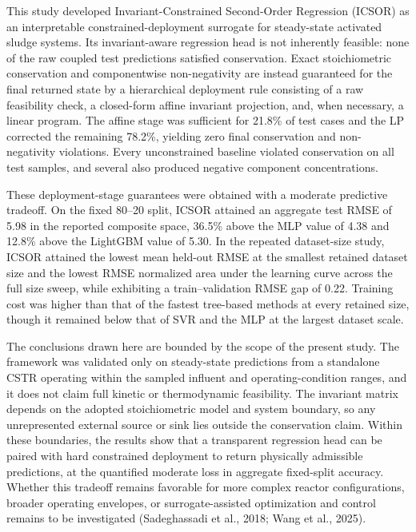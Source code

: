 \documentclass[a4paper,fleqn]{cas-sc}
\newenvironment{currentrevblock}{\begingroup\color{currentRevisionBlue}}{\endgroup}
\newenvironment{currentrevblock}{}{}
\newenvironment{revblock}{}{}
\begin{document}
\begin{revblock}

\begin{currentrevblock}
This study developed Invariant-Constrained Second-Order Regression (ICSOR) as an interpretable constrained-deployment surrogate for steady-state activated sludge systems. Its invariant-aware regression head is not inherently feasible: none of the raw coupled test predictions satisfied conservation. Exact stoichiometric conservation and componentwise non-negativity are instead guaranteed for the final returned state by a hierarchical deployment rule consisting of a raw feasibility check, a closed-form affine invariant projection, and, when necessary, a linear program. The affine stage was sufficient for 21.8\% of test cases and the LP corrected the remaining 78.2\%, yielding zero final conservation and non-negativity violations. Every unconstrained baseline violated conservation on all test samples, and several also produced negative component concentrations.
\end{currentrevblock}

\begin{currentrevblock}
These deployment-stage guarantees were obtained with a moderate predictive tradeoff. On the fixed 80--20 split, ICSOR attained an aggregate test RMSE of 5.98 in the reported composite space, 36.5\% above the MLP value of 4.38 and 12.8\% above the LightGBM value of 5.30. In the repeated dataset-size study, ICSOR attained the lowest mean held-out RMSE at the smallest retained dataset size and the lowest RMSE normalized area under the learning curve across the full size sweep, while exhibiting a train--validation RMSE gap of 0.22. Training cost was higher than that of the fastest tree-based methods at every retained size, though it remained below that of SVR and the MLP at the largest dataset scale.
\end{currentrevblock}

\begin{currentrevblock}
The conclusions drawn here are bounded by the scope of the present study. The framework was validated only on steady-state predictions from a standalone CSTR operating within the sampled influent and operating-condition ranges, and it does not claim full kinetic or thermodynamic feasibility. The invariant matrix depends on the adopted stoichiometric model and system boundary, so any unrepresented external source or sink lies outside the conservation claim. Within these boundaries, the results show that a transparent regression head can be paired with hard constrained deployment to return physically admissible predictions, at the quantified moderate loss in aggregate fixed-split accuracy. Whether this tradeoff remains favorable for more complex reactor configurations, broader operating envelopes, or surrogate-assisted optimization and control remains to be investigated (Sadeghassadi et al., 2018; Wang et al., 2025).
\end{currentrevblock}
\end{revblock}
\end{document}
